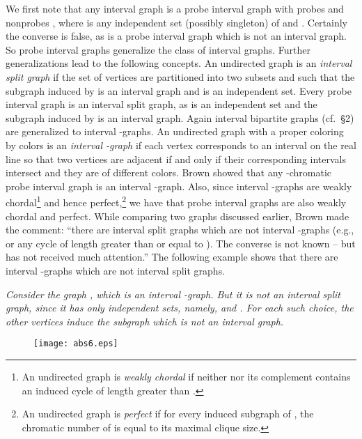 \documentclass[secthm]{elsart}
\begin{document}
We first note that any interval graph  is a probe interval graph with probes  and nonprobes , where  is any independent set (possibly singleton) of  and . Certainly the converse is false, as  is a probe interval graph which is not an interval graph. So probe interval graphs generalize the class of interval graphs. Further generalizations lead to the following concepts. An undirected graph  is an {\em{interval split graph}} \cite{Br} if the set of vertices  are partitioned into two subsets  and  such that the subgraph induced by  is an interval graph and  is an independent set. Every probe interval graph is an interval split graph, as  is an independent set and the subgraph induced by  is an interval graph. Again interval bipartite graphs (cf.~\S 2) are generalized to interval -graphs. An undirected graph with a proper coloring by  colors is an {\em{interval -graph}} \cite{Br} if each vertex corresponds to an interval on the real line so that two vertices are adjacent if and only if their corresponding intervals intersect and they are of different colors. Brown \cite{Br} showed that any -chromatic probe interval graph is an interval -graph. Also, since interval -graphs are weakly chordal\footnote{An undirected graph  is {\em weakly chordal} if neither  nor its complement  contains an induced cycle of length greater than .} and hence perfect,\footnote{An undirected graph  is {\em perfect} if for every induced subgraph  of , the chromatic number of  is equal to its maximal clique size.} we have that probe interval graphs are also weakly chordal and perfect. While comparing two graphs discussed earlier, Brown \cite{Br} made the comment:
``there are interval split graphs which are not interval -graphs (e.g.,  or any cycle of length greater than or equal to ). The converse is not known -- but has not received much attention.'' The following example shows that there are interval -graphs which are not interval split graphs.

\begin{exmp} {\em Consider the graph , which is an interval -graph. But it is not an interval split graph, since it has only  independent sets, namely,  and . For each such choice, the other  vertices induce the subgraph  which is not an interval graph.}

\begin{figure}[h]
\begin{center}
\texttt{[image: abs6.eps]}
\end{center}
\end{figure}
\end{exmp}
\end{document}
